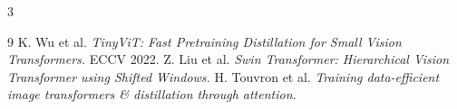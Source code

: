 \documentclass[a0,portrait]{a0poster}
\begin{document}
\begin{multicols}{3}

\singlespacing
\footnotesize 
\begin{thebibliography}{9}
 K. Wu et al. \textit{TinyViT: Fast Pretraining Distillation for Small Vision Transformers.} ECCV 2022.
 Z. Liu et al. \textit{Swin Transformer: Hierarchical Vision Transformer using Shifted Windows.}
 H. Touvron et al. \textit{Training data-efficient image transformers \& distillation through attention.}
\end{thebibliography}

\end{multicols}
\end{document}
